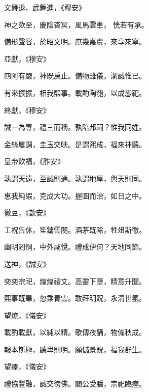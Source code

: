 \begin{pinyinscope}
 文舞退、武舞進，《穆安》



 神之欻至，慶陰杳冥，風馬雲車，
 恍若有承。



 備形聲容，於昭文明。庶幾嘉虞，來享來寧。



 亞獻，《穆安》



 四阿有嚴，神既戾止。備物雖儀，潔誠惟已。



 有來振振，相我熙事。載酌陶匏，以成毖祀。



 終獻，《穆安》



 誠一為專，禮三而稱。孰陪邦祠？惟我同姓。



 金絲屢調，圭玉交映。是謂熙成，福來神聽。



 皇帝飲福，《胙安》



 孰謂天遠，至誠則通。孰謂地厚，與天則同。



 惠我純嘏，克成大功。握圖而治，如日之中。



 徹豆，《歆安》



 工祝告休，笙鏞雲闋。酒茅既除，牲俎斯徹。



 幽明罔恫，中外咸悅。禮成伊何？天地同節。



 送神，《誠安》



 奕奕宗祀，煌煌禮文。高靈下墮，精意升聞。



 熙事既畢，忽乘青雲。敢拜明貺，永清世氛。



 望燎，《儀安》



 載酌載獻，以純以精。歌傳夜誦，物備秋成。



 報本斯極，聽卑則明。願儲景貺，福我群生。



 望瘞，《儀安》



 禮協豐融，誠交徬佛。闢公受膰，宗祀臨瘞。




\end{pinyinscope}
